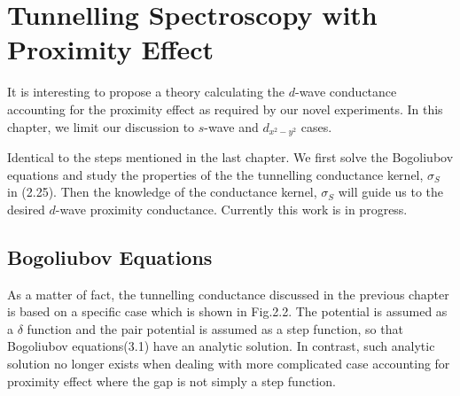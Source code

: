 \chapter{Tunnelling Spectroscopy with Proximity Effect} %
\label{Chapter3}

It is interesting to propose a theory calculating the $d$-wave conductance accounting for the proximity effect as required by our novel experiments. In this chapter, we limit our discussion to $s$-wave and $d_{x^2-y^2}$ cases.

Identical to the steps mentioned in the last chapter. We first solve the Bogoliubov equations and study the properties of the the tunnelling conductance kernel, $\sigma_S$ in (2.25). Then the knowledge of the conductance kernel, $\sigma_S$ will guide us to the desired $d$-wave proximity conductance.
Currently this work is in progress.
\section{Bogoliubov Equations}
As a matter of fact, the tunnelling conductance discussed in the previous chapter is based on a specific case which is shown in Fig.2.2. The potential is assumed as a $\delta$ function and the pair potential is assumed as a step function, so that Bogoliubov  equations(3.1) have an analytic solution. In contrast, such analytic solution no longer exists when dealing with more complicated case accounting for proximity effect where the gap is not simply a step function.
